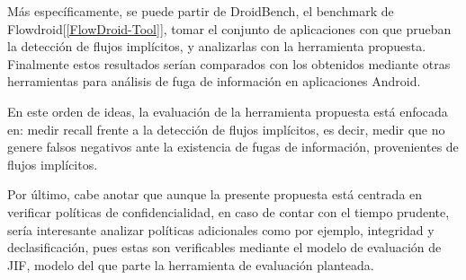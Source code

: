 
Más específicamente, se puede partir de DroidBench\cite{DroidBenchBenchmarks},
el benchmark de Flowdroid[\ref{FlowDroid-Tool}], tomar el conjunto de
aplicaciones con que prueban la detección de flujos implícitos, y analizarlas
con la herramienta propuesta.\newline
Finalmente estos resultados serían
comparados con los obtenidos mediante otras herramientas para análisis de fuga
de información en aplicaciones Android.\newline

En este orden de ideas, la evaluación de la herramienta propuesta está enfocada
en: medir recall frente a la detección de flujos implícitos, es decir, medir que
no genere falsos negativos ante la existencia de fugas de información,
provenientes de flujos implícitos.\newline

Por último, cabe anotar que aunque la presente propuesta está centrada en
verificar políticas de confidencialidad, en caso de contar con el tiempo
prudente, sería interesante analizar políticas adicionales como por ejemplo,
integridad y declasificación, pues estas son verificables mediante el modelo de
evaluación de JIF, modelo del que parte la herramienta de evaluación planteada.





